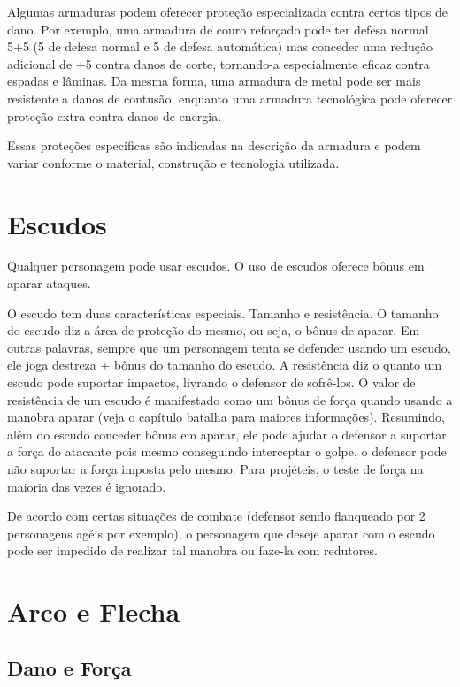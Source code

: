 Algumas armaduras podem oferecer proteção especializada contra certos tipos de dano. Por exemplo, uma armadura de couro reforçado pode ter defesa normal 5+5 (5 de defesa normal e 5 de defesa automática) mas conceder uma redução adicional de +5 contra danos de corte, tornando-a especialmente eficaz contra espadas e lâminas. Da mesma forma, uma armadura de metal pode ser mais resistente a danos de contusão, enquanto uma armadura tecnológica pode oferecer proteção extra contra danos de energia.

Essas proteções específicas são indicadas na descrição da armadura e podem variar conforme o material, construção e tecnologia utilizada.
 

\section{Escudos}

Qualquer personagem pode usar escudos. O uso de escudos oferece bônus em aparar ataques.

O escudo tem duas características especiais. Tamanho e resistência. O tamanho do escudo diz a área de proteção do mesmo, ou seja, o bônus de aparar. Em outras palavras, sempre que um personagem tenta se defender usando um escudo, ele joga destreza + bônus do tamanho do escudo. A resistência diz o quanto um escudo pode suportar impactos, livrando o defensor de sofrê-los. O valor de resistência de um escudo é manifestado como um bônus de força quando usando a manobra aparar (veja o capítulo batalha para maiores informações). Resumindo, além do escudo conceder bônus em aparar, ele pode ajudar o defensor a suportar a força do atacante pois mesmo conseguindo interceptar o golpe, o defensor pode não suportar a força imposta pelo mesmo. Para projéteis, o teste de força na maioria das vezes é ignorado. 

De acordo com certas situações de combate (defensor sendo flanqueado por 2 personagens agéis por exemplo), o personagem que deseje aparar com o escudo pode ser impedido de realizar tal manobra ou faze-la com redutores.


\section{Arco e Flecha}

\subsection{Dano e Força}

